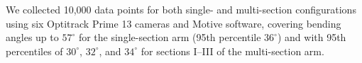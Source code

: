 We collected 10,000 data points for both single- and multi-section configurations using six Optitrack Prime 13 cameras and Motive software, covering bending angles up to $57^\circ$ for the single-section arm (95th percentile $36^\circ$) and with 95th percentiles of $30^\circ$, $32^\circ$, and $34^\circ$ for sections I--III of the multi-section arm.
